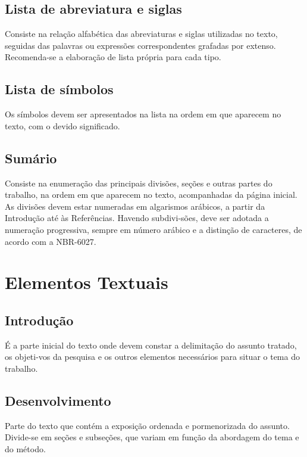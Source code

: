 \subsection{Lista de abreviatura e siglas}

Consiste na relação alfabética das abreviaturas e siglas
utilizadas no texto, seguidas das palavras ou expressões correspondentes grafadas por extenso. Recomenda-se a elaboração de lista própria para cada tipo.

\subsection{Lista de símbolos}

Os símbolos devem ser apresentados na lista na ordem em que
aparecem no texto, com o devido significado.

\subsection{Sumário}

Consiste na enumeração das principais divisões, seções e outras
partes do trabalho, na ordem em que aparecem no texto, acompanhadas da página inicial. As divisões devem estar numeradas em algarismos arábicos, a partir da Introdução até às Referências. Havendo subdivi-sões, deve ser adotada a numeração progressiva, sempre em número arábico e a distinção de caracteres, de acordo com a NBR-6027.

\section{Elementos Textuais}

\subsection{Introdução}

É a parte inicial do texto onde devem constar a delimitação do
assunto tratado, os objeti-vos da pesquisa e os outros elementos necessários para situar o tema do trabalho.

\subsection{Desenvolvimento}

Parte do texto que contém a exposição ordenada e pormenorizada do
assunto. Divide-se em seções e subseções, que variam em função da abordagem do tema e do método.

